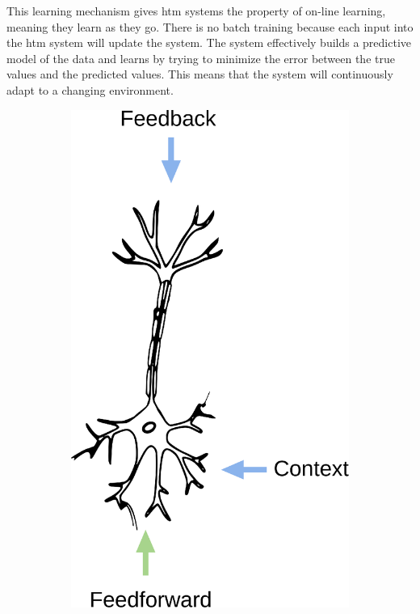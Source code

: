 This learning mechanism gives \gls*{htm} systems the property of on-line learning, meaning they learn as they go. There is no batch training because each input into the \gls*{htm} system will update the system. The system effectively builds a predictive model of the data and learns by trying to minimize the error between the true values and the predicted values. This means that the system will continuously adapt to a changing environment.
\begin{figure}[H]
    \centering
    \begin{subfigure}[b]{0.35\linewidth}
        \centering
        \hspace*{1cm}
        \includegraphics[width=\linewidth]{resources/related_works/neuron_biological}

\end{subfigure}
\end{figure}
